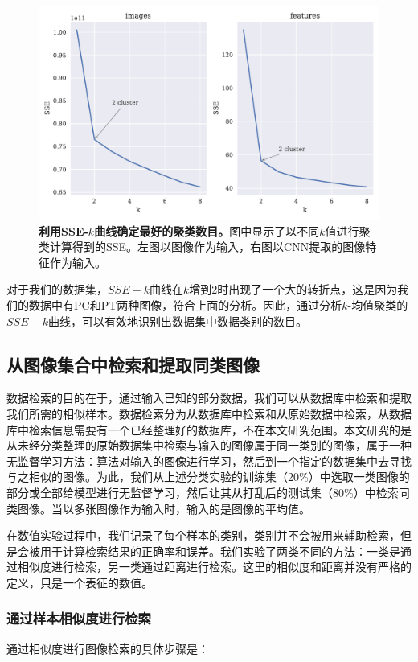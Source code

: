 \begin{figure}[H]
	\centering
	\includegraphics[width=\linewidth]{../figures/cluster/1.pdf}
	\caption{\textbf{利用SSE-$k$曲线确定最好的聚类数目。}图中显示了以不同$k$值进行聚类计算得到的SSE。左图以图像作为输入，右图以CNN提取的图像特征作为输入。}
	\label{fig:cluster}
\end{figure}

对于我们的数据集，$SSE-k$曲线在$k$增到2时出现了一个大的转折点，这是因为我们的数据中有PC和PT两种图像，符合上面的分析。因此，通过分析$k$-均值聚类的$SSE-k$曲线，可以有效地识别出数据集中数据类别的数目。

\subsection{从图像集合中检索和提取同类图像}
数据检索的目的在于，通过输入已知的部分数据，我们可以从数据库中检索和提取我们所需的相似样本。数据检索分为从数据库中检索和从原始数据中检索，从数据库中检索信息需要有一个已经整理好的数据库，不在本文研究范围。本文研究的是从未经分类整理的原始数据集中检索与输入的图像属于同一类别的图像，属于一种无监督学习方法：算法对输入的图像进行学习，然后到一个指定的数据集中去寻找与之相似的图像。为此，我们从上述分类实验的训练集（20\%）中选取一类图像的部分或全部给模型进行无监督学习，然后让其从打乱后的测试集（80\%）中检索同类图像。当以多张图像作为输入时，输入的是图像的平均值。

在数值实验过程中，我们记录了每个样本的类别，类别并不会被用来辅助检索，但是会被用于计算检索结果的正确率和误差。我们实验了两类不同的方法：一类是通过相似度进行检索，另一类通过距离进行检索。这里的相似度和距离并没有严格的定义，只是一个表征的数值。

\subsubsection{通过样本相似度进行检索}
通过相似度进行图像检索的具体步骤是：

